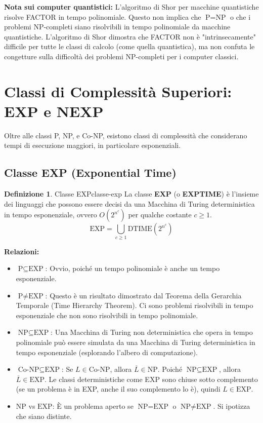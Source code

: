 \documentclass[a4paper]{article}
\theoremstyle{definition} %
\newtheorem{definition}{Definizione}
\begin{document}
\textbf{Nota sui computer quantistici:} L'algoritmo di Shor per macchine quantistiche risolve FACTOR in tempo polinomiale. Questo non implica che $\text{P} = \text{NP}$ o che i problemi NP-completi siano risolvibili in tempo polinomiale da macchine quantistiche. L'algoritmo di Shor dimostra che FACTOR non è "intrinsecamente" difficile per tutte le classi di calcolo (come quella quantistica), ma non confuta le congetture sulla difficoltà dei problemi NP-completi per i computer classici.

\section{Classi di Complessità Superiori: EXP e NEXP}

Oltre alle classi P, NP, e Co-NP, esistono classi di complessità che considerano tempi di esecuzione maggiori, in particolare esponenziali.

\subsection{Classe EXP (Exponential Time)}
\begin{definition}{Classe EXP}{classe-exp}
La classe \textbf{EXP} (o \textbf{EXPTIME}) è l'insieme dei linguaggi che possono essere decisi da una Macchina di Turing deterministica in tempo esponenziale, ovvero $O(2^{n^c})$ per qualche costante $c \ge 1$.
\[
\text{EXP} = \bigcup_{c \ge 1} \text{DTIME}(2^{n^c})
\]
\end{definition}

\textbf{Relazioni:}
\begin{itemize}
    \item $\text{P} \subseteq \text{EXP}$: Ovvio, poiché un tempo polinomiale è anche un tempo esponenziale.
    \item $\text{P} \neq \text{EXP}$: Questo è un risultato dimostrato dal Teorema della Gerarchia Temporale (Time Hierarchy Theorem). Ci sono problemi risolvibili in tempo esponenziale che non sono risolvibili in tempo polinomiale.
    \item $\text{NP} \subseteq \text{EXP}$: Una Macchina di Turing non deterministica che opera in tempo polinomiale può essere simulata da una Macchina di Turing deterministica in tempo esponenziale (esplorando l'albero di computazione).
    \item $\text{Co-NP} \subseteq \text{EXP}$: Se $L \in \text{Co-NP}$, allora $\overline{L} \in \text{NP}$. Poiché $\text{NP} \subseteq \text{EXP}$, allora $\overline{L} \in \text{EXP}$. Le classi deterministiche come EXP sono chiuse sotto complemento (se un problema è in EXP, anche il suo complemento lo è), quindi $L \in \text{EXP}$.
    \item $\text{NP}$ vs $\text{EXP}$: È un problema aperto se $\text{NP} = \text{EXP}$ o $\text{NP} \neq \text{EXP}$. Si ipotizza che siano distinte.
\end{itemize}
\end{document}

